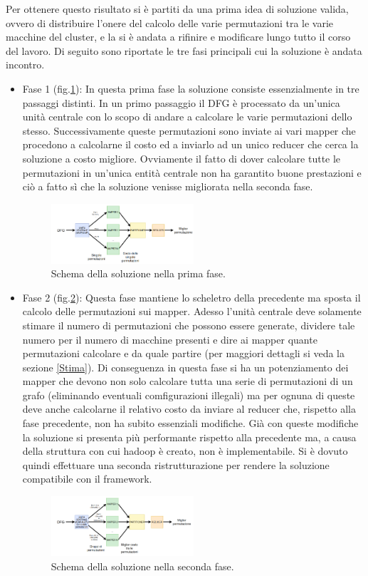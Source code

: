 \documentclass[]{IEEEtran}
\begin{document}
Per ottenere questo risultato si è partiti da una prima idea di soluzione valida, ovvero di distribuire l'onere del calcolo delle varie permutazioni tra le varie macchine del cluster, e la si è andata a rifinire e modificare lungo tutto il corso del lavoro. Di seguito sono riportate le tre fasi principali cui la soluzione è andata incontro.
\begin{itemize}
	\item Fase 1 (fig.\ref{sol_fase1}): In questa prima fase la soluzione consiste essenzialmente in tre passaggi distinti. In un primo passaggio il DFG è processato da un'unica unità centrale con lo scopo di andare a calcolare le varie permutazioni dello stesso. Successivamente queste permutazioni sono inviate ai vari mapper che procedono a calcolarne il costo ed a inviarlo ad un unico reducer che cerca la soluzione a costo migliore. Ovviamente il fatto di dover calcolare tutte le permutazioni in un'unica entità centrale non ha garantito buone prestazioni e ciò a fatto sì che la soluzione venisse migliorata nella seconda fase.
	\begin{figure}[htp]
		\includegraphics[width=0.5\textwidth]{images/sol_fase1.png}
		\caption{Schema della soluzione nella prima fase.}
		\label{sol_fase1}
	\end{figure}
	
	\item Fase 2 (fig.\ref{sol_fase2}): Questa fase mantiene lo scheletro della precedente ma sposta il calcolo delle permutazioni sui mapper. Adesso l'unità centrale deve solamente stimare il numero di permutazioni che possono essere generate, dividere tale numero per il numero di macchine presenti e dire ai mapper quante permutazioni calcolare e da quale partire (per maggiori dettagli si veda la sezione \ref{Stima}). Di conseguenza in questa fase si ha un potenziamento dei mapper che devono non solo calcolare tutta una serie di permutazioni di un grafo (eliminando eventuali comfigurazioni illegali) ma per ognuna di queste deve anche calcolarne il relativo costo da inviare al reducer che, rispetto alla fase precedente, non ha subito essenziali modifiche. Già con queste modifiche la soluzione si presenta più performante rispetto alla precedente ma, a causa della struttura con cui hadoop è creato, non è implementabile. Si è dovuto quindi effettuare una seconda ristrutturazione per rendere la soluzione compatibile con il framework.
	\begin{figure}[htp]
		\includegraphics[width=0.5\textwidth]{images/sol_fase2.png}
		\caption{Schema della soluzione nella seconda fase.}
		\label{sol_fase2}
	\end{figure}
	

\end{itemize}
\end{document}
